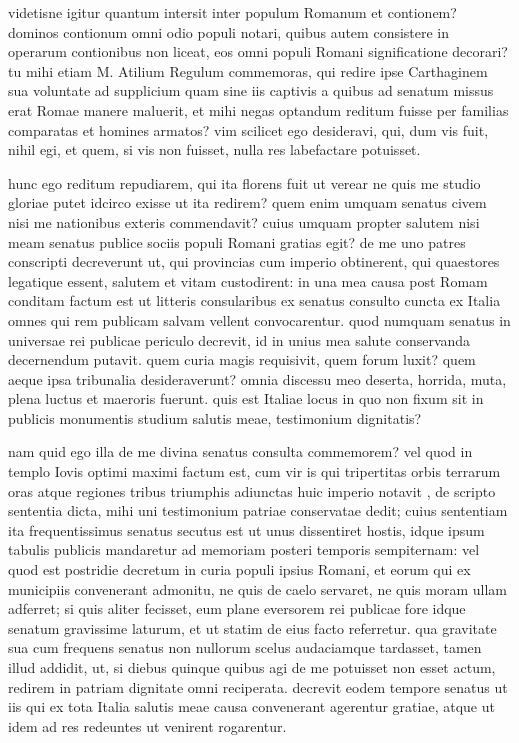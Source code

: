  videtisne igitur quantum intersit inter populum Romanum et contionem? dominos contionum omni odio populi notari, quibus autem consistere in operarum contionibus non liceat, eos omni populi Romani significatione decorari? tu mihi etiam M. Atilium Regulum commemoras, qui redire ipse Carthaginem sua voluntate ad supplicium quam sine iis captivis a quibus ad senatum missus erat Romae manere maluerit, et mihi negas optandum reditum fuisse per familias comparatas et homines armatos? vim scilicet ego desideravi, qui, dum vis fuit, nihil egi, et quem, si vis non fuisset, nulla res labefactare potuisset.

 hunc ego reditum repudiarem, qui ita florens fuit ut verear ne quis me studio gloriae putet idcirco exisse ut ita redirem? quem enim umquam senatus civem nisi me nationibus exteris commendavit? cuius umquam propter salutem nisi meam senatus publice sociis populi Romani gratias egit? de me uno patres conscripti decreverunt ut, qui provincias cum imperio obtinerent, qui quaestores legatique essent, salutem et vitam custodirent: in una mea causa post Romam conditam factum est ut litteris consularibus ex senatus consulto cuncta ex Italia omnes qui rem publicam salvam vellent convocarentur. quod numquam senatus in universae rei publicae periculo decrevit, id in unius mea salute conservanda decernendum putavit. quem curia magis requisivit, quem forum luxit? quem aeque ipsa tribunalia desideraverunt? omnia discessu meo deserta, horrida, muta, plena luctus et maeroris fuerunt. quis est Italiae locus in quo non fixum sit in publicis monumentis studium salutis meae, testimonium dignitatis?

 nam quid ego illa de me divina senatus consulta commemorem? vel quod in templo Iovis optimi maximi factum est, cum vir is qui tripertitas orbis terrarum oras atque regiones tribus triumphis adiunctas huic imperio notavit , de scripto sententia dicta, mihi uni testimonium patriae conservatae dedit; cuius sententiam ita frequentissimus senatus secutus est ut unus dissentiret hostis, idque ipsum tabulis publicis mandaretur ad memoriam posteri temporis sempiternam: vel quod est postridie decretum in curia populi ipsius Romani, et eorum qui ex municipiis convenerant admonitu, ne quis de caelo servaret, ne quis moram ullam adferret; si quis aliter fecisset, eum plane eversorem rei publicae fore idque senatum gravissime laturum, et ut statim de eius facto referretur. qua gravitate sua cum frequens senatus non nullorum scelus audaciamque tardasset, tamen illud addidit, ut, si diebus quinque quibus agi de me potuisset non esset actum, redirem in patriam dignitate omni reciperata. decrevit eodem tempore senatus ut iis qui ex tota Italia salutis meae causa convenerant agerentur gratiae, atque ut idem ad res redeuntes ut venirent rogarentur.

